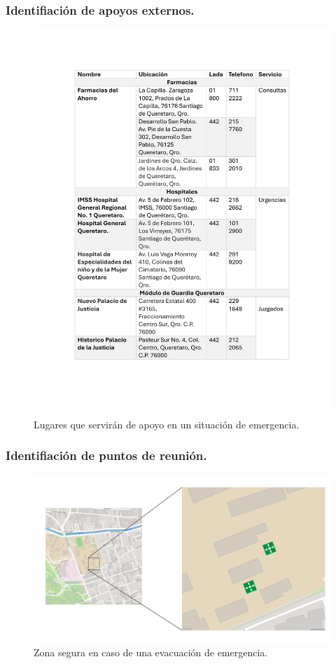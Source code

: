 \subsubsection{Identifiación de apoyos externos.}
% 
\begin{figure}[H]
    \centering
    \includegraphics[scale=0.4]{15/img/tablaApoyosExternos.pdf}
    \caption{Lugares que servirán de apoyo en un situación de emergencia.}
    \label{fig:tablaApoyosExternos}
\end{figure}
%
\subsubsection{Identifiación de puntos de reunión.}
% 
\begin{figure}[H]
    \centering
    \includegraphics[scale=0.15]{15/img/mapaPuntosDeReunion.pdf}
    \caption{Zona segura en caso de una evacuación de emergencia.}
    \label{fig:mapaPuntosDeReunion}
\end{figure}
%
